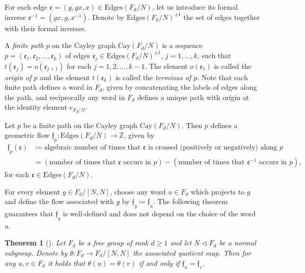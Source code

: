 \documentclass[reqno,oneside,11pt]{amsart}
\newcommand{\Z}{\mathbb{Z}}
\theoremstyle{plain}
\newtheorem{thm}{Theorem}[section] %
\theoremstyle{definition}
\begin{document}
For each edge $\mathfrak{e}=(g,gx,x)\in \mathrm{Edges}(F_d/N)$, let us introduce its formal inverse $\mathfrak{e}^{-1}=(gx,g,x^{-1})$. Denote by $\mathrm{Edges}(F_d/N)^{\pm 1}$ the set of edges together with their formal inverses.

	A \emph{finite path} $p$ on the Cayley graph $\mathrm{Cay}(F_d/N)$ is a sequence $p=(\mathfrak{e}_1,\mathfrak{e}_2,\dots,\mathfrak{e}_k)$ of edges $\mathfrak{e}_j\in \mathrm{Edges}(F_d/N)^{\pm 1}$, $j=1,\ldots,k$, such that $t(\mathfrak{e}_j)=o(\mathfrak{e}_{j+1})$ for each $j=1,2,\ldots,k-1$. The element $o(\mathfrak{e}_1)$ is called the \emph{origin of $p$} and the element $t(\mathfrak{e}_k)$ is called the \emph{terminus of $p$}. Note that each finite path defines a word in $F_d$, given by concatenating the labels of edges along the path, and reciprocally any word in $F_d$ defines a unique path with origin at the identity element $e_{F_d/N}$.


	Let $p$ be a finite path on the Cayley graph $\mathrm{Cay}(F_d/N)$. Then $p$ defines a geometric flow $\mathfrak{f}_p:\mathrm{Edges}(F_d/N)\to \Z$, given by
	\begin{align*}
	\mathfrak{f}_p(\mathfrak{e})&\coloneqq \text{algebraic number of times that }\mathfrak{e} \text{ is crossed (positively or negatively) along }p\\
	&=(\text{number of times that }\mathfrak{e} \text{ occurs in }p) - (\text{number of times that }\mathfrak{e}^{-1} \text{ occurs in }p),
	\end{align*}
	for each $\mathfrak{e}\in \mathrm{Edges}(F_d/N)$.

For every element $g\in F_d/[N,N]$, choose any word $u\in F_d$ which projects to $g$ and define  the flow associated with $g$ by $\mathfrak{f}_g\coloneqq \mathfrak{f}_{u}.$ The following theorem guarantees that $\mathfrak{f}_g$ is well-defined and does not depend on the choice of the word $u$.

\begin{thm}[{\cite[Theorem 2.7]{MyasnikovRomankovUshakovVershik2010}}]\label{thm: fox flows}
  Let $F_d$ be a free group of rank $d\ge 1$ and let $N\lhd F_d$ be a normal subgroup. Denote by $\theta: F_d\to F_d/[N,N]$ the associated quotient map.
  	Then for any $u,v\in F_d$ it holds that $\theta(u)=\theta(v)$ if and only if $\mathfrak{f}_u=\mathfrak{f}_v$.
\end{thm}
\end{document}
